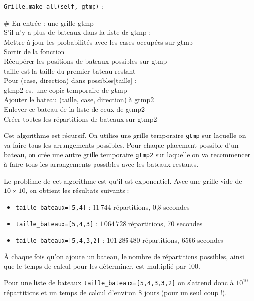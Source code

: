 \texttt{Grille.make\_all(self, gtmp)} :
\begin{algo1}
\# En entrée : une grille gtmp\\
S'il n'y a plus de bateaux dans la liste de gtmp :\\
Mettre à jour les probabilités avec les cases occupées sur gtmp\\
Sortir de la fonction\\
Récupérer les positions de bateaux possibles sur gtmp\\
taille est la taille du premier bateau restant\\
Pour (case, direction) dans possibles[taille] :\\
gtmp2 est une copie temporaire de gtmp\\
Ajouter le bateau (taille, case, direction) à gtmp2\\
Enlever ce bateau de la liste de ceux de gtmp2\\
Créer toutes les répartitions de bateaux sur gtmp2\\
\end{algo1}

Cet algorithme est récursif. On utilise une grille temporaire \texttt{gtmp} sur laquelle on va faire tous les arrangements possibles. Pour chaque placement possible d'un bateau, on crée une autre grille temporaire \texttt{gtmp2} sur laquelle on va recommencer à faire tous les arrangements possibles avec les bateaux restants.

\medskip

Le problème de cet algorithme est qu'il est exponentiel. Avec une grille vide de $10\times 10$, on obtient les résultats suivants :
\begin{itemize}
\item \texttt{taille\_bateaux=[5,4]} : $11\,744$ répartitions, 0,8 secondes
\item \texttt{taille\_bateaux=[5,4,3]} : $1\,064\,728$ répartitions, 70 secondes
\item \texttt{taille\_bateaux=[5,4,3,2]} : $101\,286\,480$ répartitions, 6566 secondes
\end{itemize}

À chaque fois qu'on ajoute un bateau, le nombre de répartitions possibles, ainsi que le temps de calcul pour les déterminer, est multiplié par 100.

Pour une liste de bateaux \texttt{taille\_bateaux=[5,4,3,3,2]} on s'attend donc à $10^{10}$ répartitions et un temps de calcul d'environ 8 jours (pour un seul coup !).

